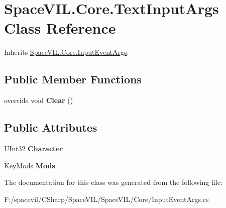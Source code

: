 \hypertarget{class_space_v_i_l_1_1_core_1_1_text_input_args}{}\section{Space\+V\+I\+L.\+Core.\+Text\+Input\+Args Class Reference}
\label{class_space_v_i_l_1_1_core_1_1_text_input_args}


Inherits \mbox{\hyperlink{class_space_v_i_l_1_1_core_1_1_input_event_args}{Space\+V\+I\+L.\+Core.\+Input\+Event\+Args}}.

\subsection*{Public Member Functions}
\begin{DoxyCompactItemize}
\item 
\mbox{\label{class_space_v_i_l_1_1_core_1_1_text_input_args_a6f6a339d6cdc2220b27e45cbc6696b07}} 
override void {\bfseries Clear} ()
\end{DoxyCompactItemize}
\subsection*{Public Attributes}
\begin{DoxyCompactItemize}
\item 
\mbox{\label{class_space_v_i_l_1_1_core_1_1_text_input_args_a748163b19d478446685e5ab54eef6e5e}} 
U\+Int32 {\bfseries Character}
\item 
\mbox{\label{class_space_v_i_l_1_1_core_1_1_text_input_args_acb44af185bdc617bdc3a71cd5fb5fc43}} 
Key\+Mods {\bfseries Mods}
\end{DoxyCompactItemize}


The documentation for this class was generated from the following file\+:\begin{DoxyCompactItemize}
\item 
F\+:/spacevil/\+C\+Sharp/\+Space\+V\+I\+L/\+Space\+V\+I\+L/\+Core/Input\+Event\+Args.\+cs\end{DoxyCompactItemize}
